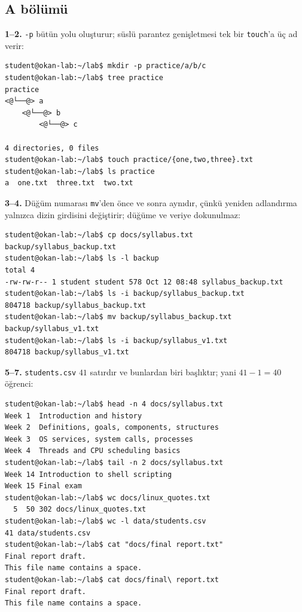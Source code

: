 \documentclass[11pt,a4paper]{article}
\newcommand{\cmd}[1]{\texttt{#1}}
\begin{document}
\subsection*{A bölümü}

\textbf{1--2.} \cmd{-p} bütün yolu oluşturur; süslü parantez genişletmesi tek bir \cmd{touch}'a üç ad verir:
\begin{lstlisting}[style=term,basicstyle=\ttfamily\scriptsize\color{light}]
student@okan-lab:~/lab$ mkdir -p practice/a/b/c
student@okan-lab:~/lab$ tree practice
practice
<@└──@> a
    <@└──@> b
        <@└──@> c

4 directories, 0 files
student@okan-lab:~/lab$ touch practice/{one,two,three}.txt
student@okan-lab:~/lab$ ls practice
a  one.txt  three.txt  two.txt
\end{lstlisting}

\textbf{3--4.} Düğüm numarası \cmd{mv}'den önce ve sonra aynıdır, çünkü yeniden adlandırma yalnızca dizin girdisini değiştirir; düğüme ve veriye dokunulmaz:
\begin{lstlisting}[style=term,basicstyle=\ttfamily\scriptsize\color{light}]
student@okan-lab:~/lab$ cp docs/syllabus.txt backup/syllabus_backup.txt
student@okan-lab:~/lab$ ls -l backup
total 4
-rw-rw-r-- 1 student student 578 Oct 12 08:48 syllabus_backup.txt
student@okan-lab:~/lab$ ls -i backup/syllabus_backup.txt
804718 backup/syllabus_backup.txt
student@okan-lab:~/lab$ mv backup/syllabus_backup.txt backup/syllabus_v1.txt
student@okan-lab:~/lab$ ls -i backup/syllabus_v1.txt
804718 backup/syllabus_v1.txt
\end{lstlisting}

\textbf{5--7.} \texttt{students.csv} $41$ satırdır ve bunlardan biri başlıktır; yani $41 - 1 = 40$ öğrenci:
\begin{lstlisting}[style=term,basicstyle=\ttfamily\scriptsize\color{light}]
student@okan-lab:~/lab$ head -n 4 docs/syllabus.txt
Week 1  Introduction and history
Week 2  Definitions, goals, components, structures
Week 3  OS services, system calls, processes
Week 4  Threads and CPU scheduling basics
student@okan-lab:~/lab$ tail -n 2 docs/syllabus.txt
Week 14 Introduction to shell scripting
Week 15 Final exam
student@okan-lab:~/lab$ wc docs/linux_quotes.txt
  5  50 302 docs/linux_quotes.txt
student@okan-lab:~/lab$ wc -l data/students.csv
41 data/students.csv
student@okan-lab:~/lab$ cat "docs/final report.txt"
Final report draft.
This file name contains a space.
student@okan-lab:~/lab$ cat docs/final\ report.txt
Final report draft.
This file name contains a space.
\end{lstlisting}
\end{document}
